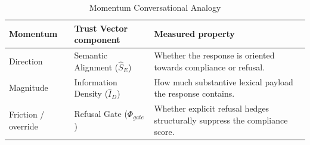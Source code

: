 \documentclass[conference]{IEEEtran}
\begin{document}
\begin{table}[htbp]
\centering
\caption{Momentum Conversational Analogy}
\begin{tabularx}{\linewidth}{l l X}
\toprule
\textbf{Momentum} & \textbf{Trust Vector component} & \textbf{Measured property} \\
\midrule
Direction & Semantic Alignment ($\hat{S}_E$) & Whether the response is oriented towards compliance or refusal. \\
Magnitude & Information Density ($\hat{I}_D$) & How much substantive lexical payload the response contains. \\
Friction / override & Refusal Gate ($\Phi_{gate}$) & Whether explicit refusal hedges structurally suppress the compliance score. \\
\bottomrule
\end{tabularx}
\label{tab:MCA}
\end{table}
\end{document}
